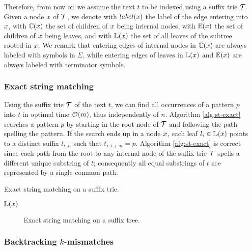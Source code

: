 Therefore, from now on we assume the text $t$ to be indexed using a suffix trie $\mathcal {T}$.
Given a node $x$ of $\mathcal {T}$, we denote with $label(x)$ the label of the edge entering into $x$, with $\mathbb {C}(x)$ the set of children of $x$ being internal nodes, with $\mathbb {E}(x)$ the set of children of $x$ being leaves, and with $\mathbb {L}(x)$ the set of all leaves of the subtree rooted in $x$. We remark that entering edges of internal nodes in $\mathbb {C}(x)$ are always labeled with symbols in $\Sigma$, while entering edges of leaves in $\mathbb {L}(x)$ and $\mathbb {E}(x)$ are always labeled with terminator symbols.

\subsubsection{Exact string matching}

Using the suffix trie $\mathcal {T}$ of the text $t$, we can find all occurrences of a pattern $p$ into $t$ in optimal time $\mathcal{O}(m)$, thus independently of $n$.
Algorithm \ref{alg:st-exact} searches a pattern $p$ by starting in the root node of $\mathcal {T}$ and following the path spelling the pattern.
If the search ends up in a node $x$, each leaf $l_i \in \mathbb {L}(x)$ points to a distinct suffix $t_{i..n}$ such that $t_{i..i+m} = p$.
Algorithm \ref{alg:st-exact} is correct since each path from the root to any internal node of the suffix trie $\mathcal {T}$ spells a different unique substring of $t$; consequently all equal substrings of $t$ are represented by a single common path.

\begin{algorithm}[h]
\caption{Exact string matching on a suffix trie.}
\label{alg:st-exact}
\begin{algorithmic}[1]
		\State \Report $\mathbb {L}(x)$
		\State {}
	\EndIf
\EndProcedure
\end{algorithmic}
\end{algorithm}

\begin{figure}[h]
\begin{center}
\caption{Exact string matching on a suffix tree.}
\label{fig:st-exact}

\end{center}
\end{figure}

\subsubsection{Backtracking $k$-mismatches}

